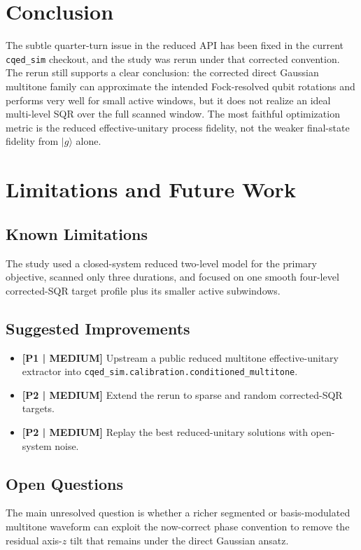 \documentclass[aps,pra,twocolumn,reprint,amsmath,amssymb]{revtex4-2}
\begin{document}
\section{Conclusion}
The subtle quarter-turn issue in the reduced API has been fixed in the current \texttt{cqed\_sim} checkout, and the study was rerun under that corrected convention. The rerun still supports a clear conclusion: the corrected direct Gaussian multitone family can approximate the intended Fock-resolved qubit rotations and performs very well for small active windows, but it does not realize an ideal multi-level SQR over the full scanned window. The most faithful optimization metric is the reduced effective-unitary process fidelity, not the weaker final-state fidelity from $|g\rangle$ alone.

\section{Limitations and Future Work}
\subsection{Known Limitations}
The study used a closed-system reduced two-level model for the primary objective, scanned only three durations, and focused on one smooth four-level corrected-SQR target profile plus its smaller active subwindows.

\subsection{Suggested Improvements}
\begin{itemize}
\item \textbf{[P1 | MEDIUM]} Upstream a public reduced multitone effective-unitary extractor into \texttt{cqed\_sim.calibration.conditioned\_multitone}.
\item \textbf{[P2 | MEDIUM]} Extend the rerun to sparse and random corrected-SQR targets.
\item \textbf{[P2 | MEDIUM]} Replay the best reduced-unitary solutions with open-system noise.
\end{itemize}

\subsection{Open Questions}
The main unresolved question is whether a richer segmented or basis-modulated multitone waveform can exploit the now-correct phase convention to remove the residual axis-$z$ tilt that remains under the direct Gaussian ansatz.
\end{document}

